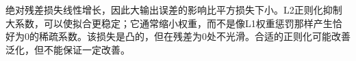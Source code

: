 绝对残差损失线性增长，因此大输出误差的影响比平方损失下小。L2正则化抑制大系数，可以使拟合更稳定；它通常缩小权重，而不是像L1权重惩罚那样产生恰好为0的稀疏系数。该损失是凸的，但在残差为0处不光滑。合适的正则化可能改善泛化，但不能保证一定改善。
